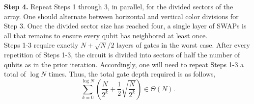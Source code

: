 \documentclass[superscriptaddress,aps,pra,nofootinbib,notitlepage,10pt,longbibliography]{revtex4-1}
\begin{document}
{\bf Step 4.} Repeat Steps 1 through 3, in parallel, for the divided sectors of the array. One should alternate between horizontal and vertical color divisions for Step 3. Once the divided sector size has reached four, a single layer of SWAPs is all that remains to ensure every qubit has neighbored at least once.\\

Steps 1-3 require exactly $N + \sqrt{N}/2$ layers of gates in the worst case. After every repetition of Steps 1-3, the circuit is divided into sectors of half the number of qubits as in the prior iteration. Accordingly, one will need to repeat Steps 1-3 a total of $\log N$ times. Thus, the total gate depth required is as follows,
\begin{equation}
\sum_{k=0}^{\log N} \left(\frac{N}{2^k} + \frac{1}{2}\sqrt{\frac{N}{2^k}}\right) \in \Theta\left(N\right).
\end{equation}
\end{document}
